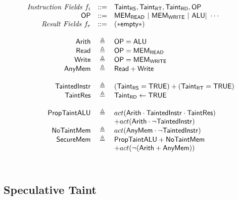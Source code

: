 \documentclass[12pt, letterpaper]{article}
\begin{document}
  \[
  \begin{array}{r c l}
    \mathit{Instruction\ Fields}\ f_i &::=& \mathsf{Taint_{RS}}, \mathsf{Taint_{RT}}, \mathsf{Taint_{RD}}, \mathsf{OP}\\
    \mathsf{OP} &::=& \mathsf{MEM_{READ}}\ |\ \mathsf{MEM_{WRITE}}\ |\ \mathsf{ALU} |\ \cdots \\
    \mathit{Result\ Fields}\ f_r &::=& \mathsf{(*empty*)}\\\\

    \mathsf{Arith}   &\triangleq& \mathsf{OP} = \mathsf{ALU}\\
    \mathsf{Read}    &\triangleq& \mathsf{OP} = \mathsf{MEM_{READ}}\\
    \mathsf{Write}   &\triangleq& \mathsf{OP} = \mathsf{MEM_{WRITE}}\\
    \mathsf{AnyMem}  &\triangleq& \mathsf{Read} + \mathsf{Write}\\\\

    \mathsf{TaintedInstr} &\triangleq& ( \mathsf{Taint_{RS}} = \mathsf{TRUE} ) + ( \mathsf{Taint_{RT}} = \mathsf{TRUE} )\\
    \mathsf{TaintRes}     &\triangleq& \mathsf{Taint_{RD}} \leftarrow \mathsf{TRUE}\\\\

    \mathsf{PropTaintALU} &\triangleq&
      act(\mathsf{Arith}\cdot \mathsf{TaintedInstr}\cdot \mathsf{TaintRes})\\
      &&+
      act(\mathsf{Arith}\cdot \neg \mathsf{TaintedInstr})\\
    \mathsf{NoTaintMem} &\triangleq&
      act(\mathsf{AnyMem}\cdot \neg \mathsf{TaintedInstr})\\
    \mathsf{SecureMem} &\triangleq& \mathsf{PropTaintALU} + \mathsf{NoTaintMem}\\
      &&+
      act(\neg (\mathsf{Arith} + \mathsf{AnyMem}))
  \end{array}
  \]\\

\subsection{Speculative Taint}
\end{document}
